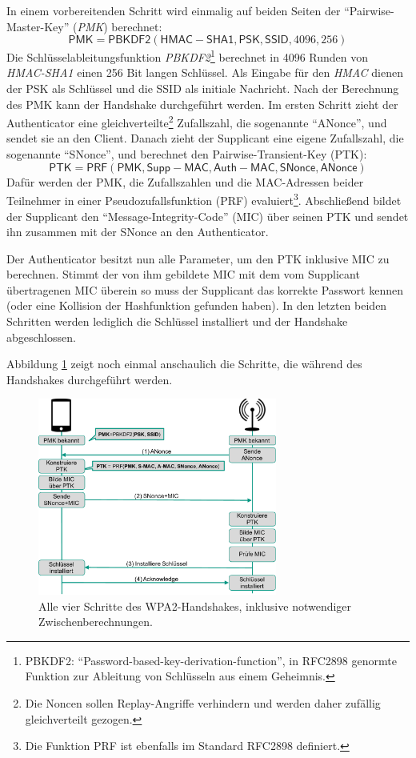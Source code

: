 In einem vorbereitenden Schritt wird einmalig auf beiden Seiten der \enquote{Pairwise-Master-Key} (\textit{PMK}) berechnet:
\[\mathsf{PMK} = \mathsf{PBKDF2}(\mathsf{HMAC-SHA1}, \mathsf{PSK}, \mathsf{SSID}, 4096, 256)\]
Die Schlüsselableitungsfunktion \textit{PBKDF2}\footnote{PBKDF2: \enquote{Password-based-key-derivation-function}, in RFC2898 genormte Funktion zur Ableitung von Schlüsseln aus einem Geheimnis.} berechnet in 4096 Runden von \textit{HMAC-SHA1} einen 256 Bit langen Schlüssel.
Als Eingabe für den \textit{HMAC} dienen der PSK als Schlüssel und die SSID als initiale Nachricht.
Nach der Berechnung des PMK kann der Handshake durchgeführt werden.
Im ersten Schritt zieht der Authenticator eine gleichverteilte\footnote{Die Noncen sollen Replay-Angriffe verhindern und werden daher zufällig gleichverteilt gezogen.} Zufallszahl, die sogenannte \enquote{ANonce}, und sendet sie an den Client.
Danach zieht der Supplicant eine eigene Zufallszahl, die sogenannte \enquote{SNonce}, und berechnet den Pairwise-Transient-Key (PTK):
\[\mathsf{PTK} = \mathsf{PRF}(\mathsf{PMK}, \mathsf{Supp-MAC}, \mathsf{Auth-MAC}, \mathsf{SNonce}, \mathsf{ANonce})\]
Dafür werden der PMK, die Zufallszahlen und die MAC-Adressen beider Teilnehmer in einer Pseudozufallsfunktion (PRF) evaluiert\footnote{Die Funktion PRF ist ebenfalls im Standard RFC2898 definiert.}.
Abschließend bildet der Supplicant den \enquote{Message-Integrity-Code} (MIC) über seinen PTK und sendet ihn zusammen mit der SNonce an den Authenticator.

Der Authenticator besitzt nun alle Parameter, um den PTK inklusive MIC zu berechnen.
Stimmt der von ihm gebildete MIC mit dem vom Supplicant übertragenen MIC überein so muss der Supplicant das korrekte Passwort kennen (oder eine Kollision der Hashfunktion gefunden haben).
In den letzten beiden Schritten werden lediglich die Schlüssel installiert und der Handshake abgeschlossen.

Abbildung \ref{fig:wpa2handshake} zeigt noch einmal anschaulich die Schritte, die während des Handshakes durchgeführt werden.
\begin{figure}[ht]
	\centering
	\includegraphics[width=0.70\textwidth]{graphics/wpa2handshake}
	\caption[WPA2-PSK-Handshake]{Alle vier Schritte des WPA2-Handshakes, inklusive notwendiger Zwischenberechnungen.}
	\label{fig:wpa2handshake}
\end{figure}

\FloatBarrier
